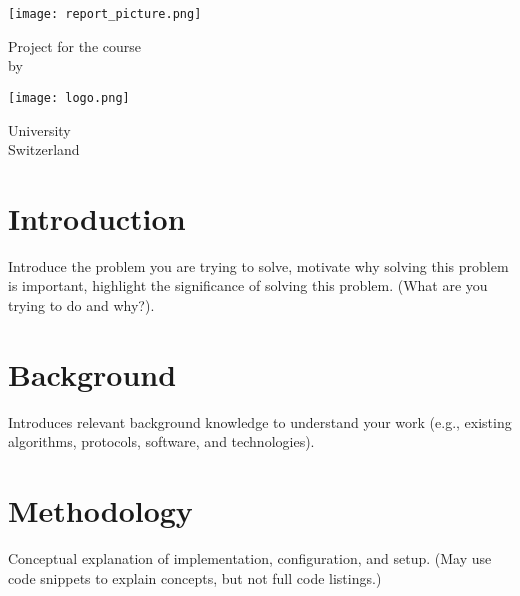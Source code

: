 \documentclass{article} %
\begin{document}
\begin{titlepage}
    \begin{center}
        \vspace*{1cm}

        \Huge
        \textbf{\titlename}

        \vspace{0.5cm}
        \LARGE
        \subtitlename

        \vspace{1.5cm}

        \texttt{[image: report\_picture.png]}

        \vspace{1.5cm}

        Project for the course\\
        \course by\\
        \textbf{\authorname}

        \vfill
        \texttt{[image: logo.png]}

        \Large
        University \uniname\\
        Switzerland\\
        \semester

    \end{center}
\end{titlepage}

\tableofcontents
\clearpage

\section{Introduction}
Introduce the problem you are trying to solve, motivate why solving this
problem is important, highlight the significance of solving this problem. (What are you trying to
do and why?).\\
\lipsum[1-1] %

\section{Background}
Introduces relevant background knowledge to understand your work (e.g.,
existing algorithms, protocols, software, and technologies).\\
\lipsum[1-1] %
\clearpage

\section{Methodology}
Conceptual explanation of implementation, configuration, and setup. (May use
code snippets to explain concepts, but not full code listings.)\\
\lipsum[1-2]
\clearpage
\end{document}
